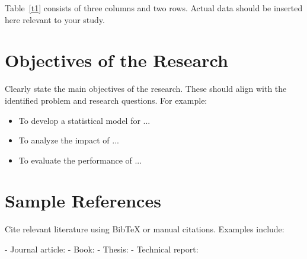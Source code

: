 Table~\ref{t1} consists of three columns and two rows. Actual data should be inserted here relevant to your study.

\section{Objectives of the Research}
Clearly state the main objectives of the research. These should align with the identified problem and research questions. For example:

\begin{itemize}
    \item To develop a statistical model for ...
    \item To analyze the impact of ...
    \item To evaluate the performance of ...
\end{itemize}

\section{Sample References}
Cite relevant literature using BibTeX or manual citations. Examples include:

- Journal article: \cite{Si86}
- Book: \cite{ro95}
- Thesis: \cite{Het16}
- Technical report: \cite{Te80}
